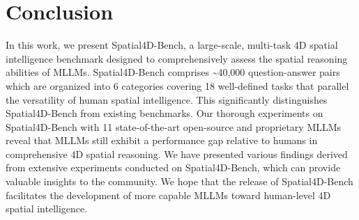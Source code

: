 



\section{Conclusion}
\label{conclusion}

In this work, we present Spatial4D-Bench, a large-scale, multi-task 4D spatial intelligence benchmark designed to comprehensively assess the spatial reasoning abilities of MLLMs.
Spatial4D-Bench comprises \textasciitilde40,000 question-answer pairs which are organized into 6 categories covering 18 well-defined tasks that parallel the versatility of human spatial intelligence. 
This significantly distinguishes Spatial4D-Bench from existing benchmarks.
Our thorough experiments on Spatial4D-Bench with 11 state-of-the-art open-source and proprietary MLLMs reveal that MLLMs still exhibit a performance gap relative to humans in comprehensive 4D spatial reasoning.
We have presented various findings derived from extensive experiments conducted on Spatial4D-Bench, which can provide valuable insights to the community.
We hope that the release of  Spatial4D-Bench facilitates the development of more capable MLLMs toward human-level 4D spatial intelligence.
